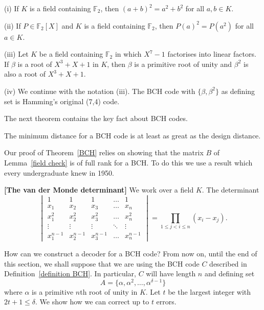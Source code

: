 \begin{example}\label{Hamming BCH}
(i) If $K$ is a field containing
${\mathbb F}_{2}$, then $(a+b)^{2}=a^{2}+b^{2}$
for all $a,b\in K$.

(ii) If $P\in {\mathbb F}_{2}[X]$ and $K$ is a field containing
${\mathbb F}_{2}$, then $P(a)^{2}=P(a^{2})$
for all $a\in K$.

(iii) Let $K$ be a field containing
${\mathbb F}_{2}$ in which $X^{7}-1$ factorises
into linear factors. If $\beta$ is a root of $X^{3}+X+1$
in $K$, then $\beta$ is a primitive root of unity
and $\beta^{2}$ is also a root of $X^{3}+X+1$.

(iv) We continue with the notation (iii).
The BCH
code with $\{\beta,\beta^{2}\}$ as defining set
is Hamming's original (7,4) code.
\end{example}

The next theorem contains the key fact about BCH codes.
\begin{theorem}\label{BCH}
The minimum distance for a BCH code
is at least as great as the design distance.
\end{theorem}

Our proof of Theorem~\ref{BCH} relies on showing that
the matrix $B$ of Lemma~\ref{field check} is of full rank
for a BCH. To do this we use a result which every undergraduate
knew in 1950.
\begin{lemma}{\bf [The van der Monde determinant]}\label{L;van der Monde}
We work over a field $K$. The determinant
\begin{equation*}
\begin{vmatrix}
1&1&1&\hdots&1\\
x_{1}&x_{2}&x_{3}&\hdots&x_{n}\\
x_{1}^{2}&x_{2}^{2}&x_{3}^{2}&\hdots&x_{n}^{2}\\
\vdots&\vdots&\vdots&\ddots&\vdots\\
x_{1}^{n-1}&x_{2}^{n-1}&x_{3}^{n-1}&\hdots&x_{n}^{n-1}
\end{vmatrix}
=\prod_{1\leq j<i\leq n}(x_{i}-x_{j}).
\end{equation*}
\end{lemma}

How can we construct a decoder for a BCH code? From
now on, until the end of this section, we shall
suppose that we are using the BCH code $C$ described
in Definition~\ref{definition BCH}. In
particular, $C$ will have length $n$ and
defining set
\[A=\{\alpha,\alpha^{2},\dots,\alpha^{\delta-1}\}\]
where $\alpha$ is a primitive $n$th root of unity
in $K$. Let $t$ be the largest integer with $2t+1\leq\delta$.
We show how we can correct up to $t$ errors.


